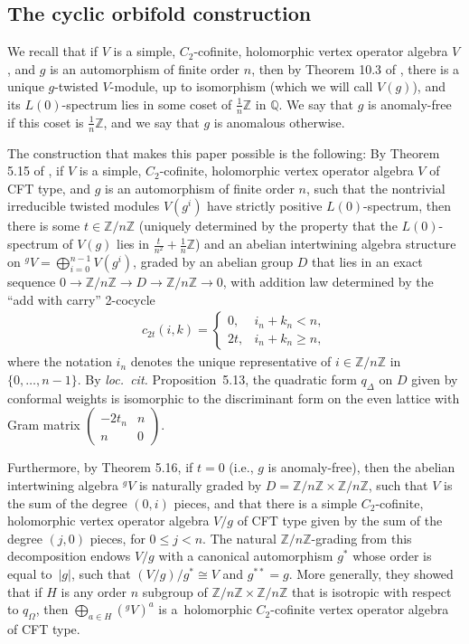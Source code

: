 \documentclass[pdftex]{sigma}
\newcommand{\bQ}{\mathbb{Q}}
\newcommand{\bZ}{\mathbb{Z}}
\theoremstyle{definition}
\begin{document}
\subsection{The cyclic orbifold construction}

We recall that if $V$ is a simple, $C_2$-cofinite, holomorphic vertex operator algebra $V$, and $g$ is an automorphism of finite order $n$, then by Theorem 10.3 of \cite{DLM97}, there is a unique $g$-twisted $V$-module, up to isomorphism (which we will call $V(g)$), and its $L(0)$-spectrum lies in some coset of $\frac{1}{n}\bZ$ in $\bQ$. We say that $g$ is anomaly-free if this coset is $\frac{1}{n}\bZ$, and we say that $g$ is anomalous otherwise.

The construction that makes this paper possible is the following: By Theorem 5.15 of \cite{vEMS}, if $V$ is a simple, $C_2$-cofinite, holomorphic vertex operator algebra $V$ of CFT type, and $g$ is an automorphism of finite order $n$, such that the nontrivial irreducible twisted modules $V(g^i)$ have strictly positive $L(0)$-spectrum, then there is some $t \in \bZ/n\bZ$ (uniquely determined by the property that the $L(0)$-spectrum of $V(g)$ lies in $\frac{t}{n^2} + \frac{1}{n}\bZ$) and an abelian intertwining algebra structure on ${}^gV = \bigoplus_{i=0}^{n-1} V(g^i)$, graded by an abelian group $D$ that lies in an exact sequence $0 \to \bZ/n\bZ \to D \to \bZ/n\bZ \to 0$, with addition law determined by the ``add with carry'' 2-cocycle
\begin{gather*} c_{2t}(i,k) = \begin{cases} 0, & i_n + k_n < n, \\ 2t, & i_n + k_n \geq n, \end{cases} \end{gather*}
where the notation $i_n$ denotes the unique representative of $i \in \bZ/n\bZ$ in $\{0,\ldots,n-1\}$. By \textit{loc.\ cit.} Proposition~5.13, the quadratic form $q_\Delta$ on $D$ given by conformal weights is isomorphic to the discriminant form on the even lattice with Gram matrix $\left( \begin{smallmatrix} -2t_n & n \\ n & 0 \end{smallmatrix} \right)$.

Furthermore, by Theorem 5.16, if $t=0$ (i.e., $g$ is anomaly-free), then the abelian intertwining algebra ${}^gV$ is naturally graded by $D = \bZ/n\bZ \times \bZ/n\bZ$, such that $V$ is the sum of the degree $(0,i)$ pieces, and that there is a simple $C_2$-cofinite, holomorphic vertex operator algebra $V/g$ of CFT type given by the sum of the degree $(j,0)$ pieces, for $0 \leq j < n$. The natural $\bZ/n\bZ$-grading from this decomposition endows $V/g$ with a canonical automorphism $g^*$ whose order is equal to~$|g|$, such that $(V/g)/g^* \cong V$ and $g^{**} = g$. More generally, they showed that if $H$ is any order $n$ subgroup of $\bZ/n\bZ \times \bZ/n\bZ$ that is isotropic with respect to $q_\Omega$, then $\bigoplus_{a \in H} ({}^gV)^a$ is a~holomorphic $C_2$-cofinite vertex operator algebra of CFT type.
\end{document}
